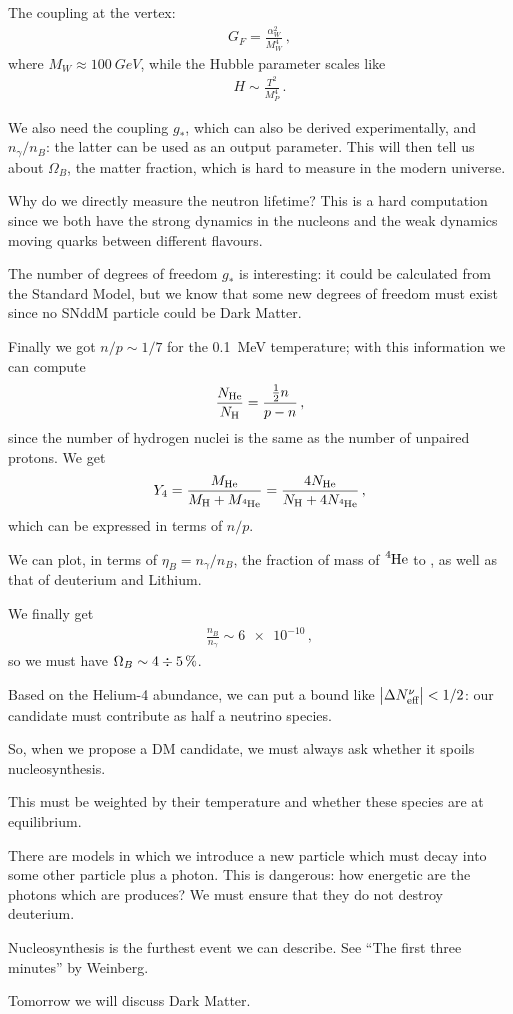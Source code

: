 \documentclass[main.tex]{subfiles}
\begin{document}
The coupling at the vertex:
%
\begin{align}
G_F = \frac{\alpha_{W}^2}{M_W^{4}}
\,,
\end{align}
%
where \(M_W \approx \SI{100}{GeV}\), while the Hubble parameter scales like 
%
\begin{align}
H \sim \frac{T^2}{M_P^{4}}
\,.
\end{align}

We also need the coupling \(g_{*}\), which can also be derived experimentally, and \(n_\gamma / n_B\): the latter can be used as an output parameter. 
This will then tell us about \(\Omega_{B}\), the matter fraction, which is hard to measure in the modern universe. 

Why do we directly measure the neutron lifetime? This is a hard computation since we both have the strong dynamics in the nucleons and the weak dynamics moving quarks between different flavours. 

The number of degrees of freedom \(g_{*}\) is interesting: it could be calculated from the Standard Model, but we know that some new degrees of freedom must exist since no SNddM particle could be Dark Matter.

Finally we got \(n/p \sim 1/7\) for the \SI{0.1}{MeV} temperature; with this information we can compute 
%
\begin{align}
\frac{N_{\ce{He}}}{N_{\ce{H}}} = \frac{ \frac{1}{2} n }{p - n}
\,,
\end{align}
%
since the number of hydrogen nuclei is the same as the number of unpaired protons. 
We get 
%
\begin{align}
Y_{4} = \frac{M_{\ce{He}}}{M_{\ce{H}} + M_{\ce{^{4}He}}} = \frac{4 N_{\ce{He}}}{N_{\ce{H}} + 4 N_{\ce{^{4}He}}}
\,,
\end{align}
%
which can be expressed in terms of \(n/p\). 

We can plot, in terms of \(\eta_{B } = n_{\gamma } / n_{B}\), the fraction of mass of \(\ce{^{4}He}\) to , as well as that of deuterium and Lithium. 

We finally get 
%
\begin{align}
\frac{n_B}{n_\gamma } \sim \num{6e-10}
\,,
\end{align}
%
so we must have \(\Omega_{B} \sim \num{4} \divisionsymbol \SI{5}{\percent}\).

Based on the Helium-4 abundance, we can put a bound like \(\abs{\Delta N _{\text{eff}}^{\nu }} < 1/2\): our candidate must contribute as half a neutrino species.

So, when we propose a DM candidate, we must always ask whether it spoils nucleosynthesis. 

This must be weighted by their temperature and whether these species are at equilibrium. 

There are models in which we introduce a new particle which must decay into some other particle plus a photon. 
This is dangerous: how energetic are the photons which are produces? We must ensure that they do not destroy deuterium. 

Nucleosynthesis is the furthest event we can describe. 
See ``The first three minutes'' by Weinberg.

Tomorrow we will discuss Dark Matter. 
\end{document}
